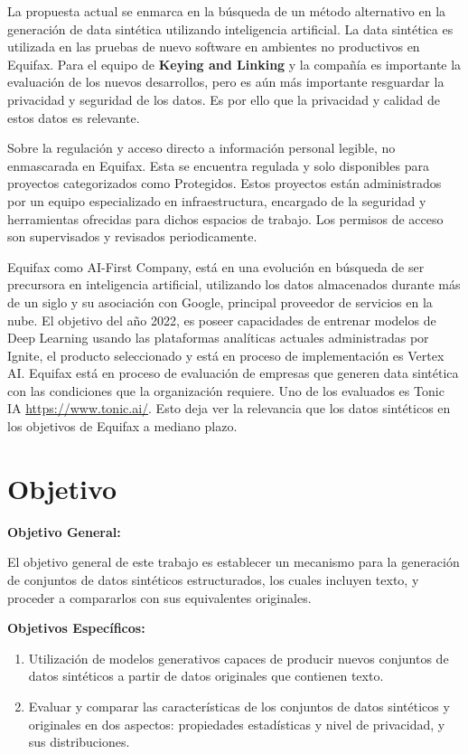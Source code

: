 La propuesta actual se enmarca en la búsqueda de un método alternativo en la generación de data sintética utilizando inteligencia artificial. La data sintética es utilizada en las pruebas de nuevo software en ambientes no productivos en Equifax. Para el equipo de \textbf{Keying and Linking} y la compañía es importante la evaluación de los nuevos desarrollos, pero es aún más importante resguardar la privacidad y seguridad de los datos. Es por ello que la privacidad y calidad de estos datos es relevante.

Sobre la regulación y acceso directo a información personal legible, no enmascarada en Equifax. Esta se encuentra regulada y solo disponibles para proyectos categorizados como Protegidos. Estos proyectos están administrados por un equipo especializado en infraestructura, encargado de la seguridad y herramientas ofrecidas para dichos espacios de trabajo. Los permisos de acceso son supervisados y revisados periodicamente.

Equifax como AI-First Company, está en una evolución en búsqueda de ser precursora en inteligencia artificial, utilizando los datos almacenados durante más de un siglo y su asociación con Google, principal proveedor de servicios en la nube. El objetivo del año 2022, es poseer capacidades de entrenar modelos de Deep Learning usando las plataformas analíticas actuales administradas por Ignite, el producto seleccionado y está en proceso de implementación es Vertex AI. Equifax está en proceso de evaluación de empresas que generen data sintética con las condiciones que la organización requiere. Uno de los evaluados es Tonic IA \url{https://www.tonic.ai/}. Esto deja ver la relevancia que los datos sintéticos en los objetivos de Equifax a mediano plazo.
\newpage

\section{Objetivo}

\textbf{Objetivo General:}

El objetivo general de este trabajo es establecer un mecanismo para la generación de conjuntos de datos sintéticos estructurados, los cuales incluyen texto, y proceder a compararlos con sus equivalentes originales.

\textbf{Objetivos Específicos:}
\begin{enumerate}
    \item Utilización de modelos generativos capaces de producir nuevos conjuntos de datos sintéticos a partir de datos originales que contienen texto.
    \item Evaluar y comparar las características de los conjuntos de datos sintéticos y originales en dos aspectos: propiedades estadísticas y nivel de privacidad, y sus distribuciones.
\end{enumerate}

